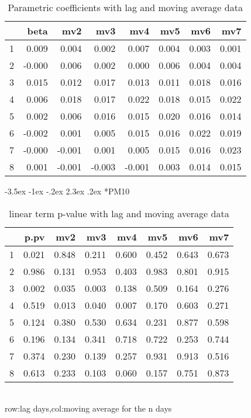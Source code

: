 \documentclass[a4paper, 12pt]{article}
\makeatletter
\def\large{\fontsize{14}{20}\selectfont}
\renewcommand\subsection{\@startsection {subsection}{1}{\z@}%
                                   {-3.5ex \@plus -1ex \@minus -.2ex}%
                                   {2.3ex \@plus.2ex}%
                                   {\centering\normalfont\large\bfseries}}
\makeatother
\begin{document}
\begin{table}[h]
\centering
\caption{Parametric coefficients with lag and moving average data}
\begin{tabular}{rrrrrrrr}
  \hline
 & beta & mv2 & mv3 & mv4 & mv5 & mv6 & mv7 \\
  \hline
1 & 0.009 & 0.004 & 0.002 & 0.007 & 0.004 & 0.003 & 0.001 \\
  2 & -0.000 & 0.006 & 0.002 & 0.000 & 0.006 & 0.004 & 0.004 \\
  3 & 0.015 & 0.012 & 0.017 & 0.013 & 0.011 & 0.018 & 0.016 \\
  4 & 0.006 & 0.018 & 0.017 & 0.022 & 0.018 & 0.015 & 0.022 \\
  5 & 0.002 & 0.006 & 0.016 & 0.015 & 0.020 & 0.016 & 0.014 \\
  6 & -0.002 & 0.001 & 0.005 & 0.015 & 0.016 & 0.022 & 0.019 \\
  7 & -0.000 & -0.001 & 0.001 & 0.005 & 0.015 & 0.016 & 0.023 \\
  8 & 0.001 & -0.001 & -0.003 & -0.001 & 0.003 & 0.014 & 0.015 \\
   \hline
\end{tabular}
\end{table}
\clearpage
\subsection*{PM10}
\begin{table}[h]
\centering
\caption{linear term p-value with lag and moving average data}
\begin{tabular}{rrrrrrrr}
  \hline
 & p.pv & mv2 & mv3 & mv4 & mv5 & mv6 & mv7 \\
  \hline
1 & 0.021 & 0.848 & 0.211 & 0.600 & 0.452 & 0.643 & 0.673 \\
  2 & 0.986 & 0.131 & 0.953 & 0.403 & 0.983 & 0.801 & 0.915 \\
  3 & 0.002 & 0.035 & 0.003 & 0.138 & 0.509 & 0.164 & 0.276 \\
  4 & 0.519 & 0.013 & 0.040 & 0.007 & 0.170 & 0.603 & 0.271 \\
  5 & 0.124 & 0.380 & 0.530 & 0.634 & 0.231 & 0.877 & 0.598 \\
  6 & 0.196 & 0.134 & 0.341 & 0.718 & 0.722 & 0.253 & 0.744 \\
  7 & 0.374 & 0.230 & 0.139 & 0.257 & 0.931 & 0.913 & 0.516 \\
  8 & 0.613 & 0.233 & 0.103 & 0.060 & 0.157 & 0.751 & 0.873 \\
   \hline
\end{tabular}
\\row:lag days,col:moving average for the n days
\end{table}
\end{document}
